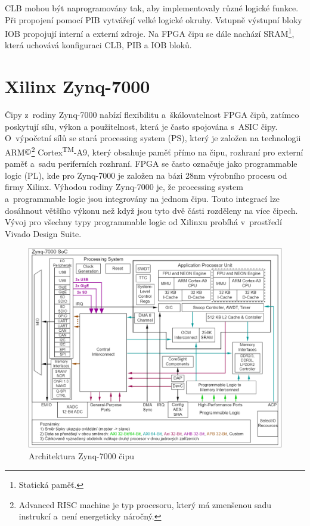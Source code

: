 CLB mohou být naprogramovány tak, aby implementovaly různé logické funkce. Při propojení pomocí PIB vytvářejí velké logické okruhy. Vstupně výstupní bloky IOB propojují interní a externí zdroje. Na FPGA čipu se dále nachází SRAM\footnote{Statická paměť.\label{foot:sram}}, která uchovává konfiguraci CLB, PIB a IOB bloků.\cite{Sekanina3540403779ISBN}
\setcounter{footnote}{0}
\section{Xilinx Zynq-7000}
Čipy z~rodiny Zynq-7000 nabízí flexibilitu a~škálovatelnost FPGA čipů, zatímco poskytují sílu, výkon a použitelnost, která je často spojována s~ASIC čipy.
O~výpočetní sílů se stará processing system (PS), který je založen na technologii ARM$\copyright$\footnote{Advanced RISC machine je typ procesoru, který má zmenšenou sadu instrukcí a~není energeticky náročný.\label{foot:ARM}} Cortex\textsuperscript{TM}-A9, který obsahuje paměť přímo na čipu, rozhraní pro externí paměť a~sadu periferních rozhraní. FPGA se často označuje jako programmable logic (PL), kde pro Zynq-7000 je založen na bázi 28nm výrobního procesu od firmy Xilinx. Výhodou rodiny Zynq-7000 je, že processing system a~programmable logic jsou integrovány na jednom čipu. Touto integrací lze dosáhnout většího výkonu než když jsou tyto dvě části rozděleny na více čipech. Vývoj pro všechny typy programmable logic od Xilinxu probíhá v~prostředí Vivado Design Suite.\cite{Zynq-7000}
\begin{figure}[!h]
  \begin{center}
    \includegraphics[scale=0.4]{obrazky/Zynq-7000-own.png}
  \end{center}
  \caption[Architektura Zynq-7000]{Architektura Zynq-7000 čipu \cite{Zynq-7000}}
  \label{img:Zynq-7000}
\end{figure}
